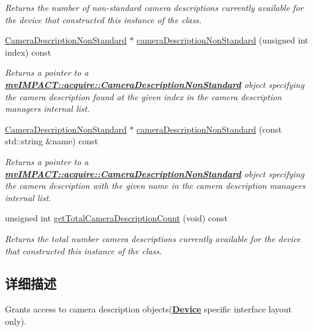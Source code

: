 \begin{DoxyCompactItemize}
\begin{DoxyCompactList}\small\item\em Returns the number of non-\/standard camera descriptions currently available for the device that constructed this instance of the class. \end{DoxyCompactList}\item 
\hyperlink{classmv_i_m_p_a_c_t_1_1acquire_1_1_camera_description_non_standard}{Camera\+Description\+Non\+Standard} $\ast$ \hyperlink{classmv_i_m_p_a_c_t_1_1acquire_1_1_camera_description_manager_aa3fcc43230b21d472ccbfa6dc4fd2f05}{camera\+Description\+Non\+Standard} (unsigned int index) const 
\begin{DoxyCompactList}\small\item\em Returns a pointer to a {\bfseries \hyperlink{classmv_i_m_p_a_c_t_1_1acquire_1_1_camera_description_non_standard}{mv\+I\+M\+P\+A\+C\+T\+::acquire\+::\+Camera\+Description\+Non\+Standard}} object specifying the camera description found at the given index in the camera description managers internal list. \end{DoxyCompactList}\item 
\hyperlink{classmv_i_m_p_a_c_t_1_1acquire_1_1_camera_description_non_standard}{Camera\+Description\+Non\+Standard} $\ast$ \hyperlink{classmv_i_m_p_a_c_t_1_1acquire_1_1_camera_description_manager_a560cc6a14c30fe41fef4b4afbcf63f56}{camera\+Description\+Non\+Standard} (const std\+::string \&name) const 
\begin{DoxyCompactList}\small\item\em Returns a pointer to a {\bfseries \hyperlink{classmv_i_m_p_a_c_t_1_1acquire_1_1_camera_description_non_standard}{mv\+I\+M\+P\+A\+C\+T\+::acquire\+::\+Camera\+Description\+Non\+Standard}} object specifying the camera description with the given name in the camera description managers internal list. \end{DoxyCompactList}\item 
unsigned int \hyperlink{classmv_i_m_p_a_c_t_1_1acquire_1_1_camera_description_manager_a5efb9a43877db573ba51518c335a184b}{get\+Total\+Camera\+Description\+Count} (void) const 
\begin{DoxyCompactList}\small\item\em Returns the total number camera descriptions currently available for the device that constructed this instance of the class. \end{DoxyCompactList}\end{DoxyCompactItemize}


\subsection{详细描述}
Grants access to camera description objects({\bfseries \hyperlink{classmv_i_m_p_a_c_t_1_1acquire_1_1_device}{Device}} specific interface layout only). 

